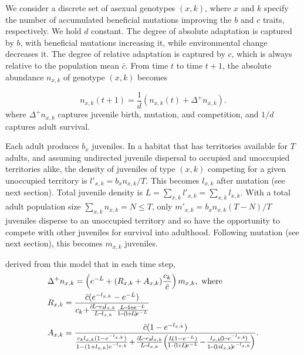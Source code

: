 \documentclass[9pt,twocolumn,twoside,lineno]{gsajnl}
\begin{document}
We consider a discrete set of asexual genotypes $(x,k)$, where $x$ and $k$ specify the number of accumulated beneficial mutations improving the $b$ and $c$ traits, respectively. We hold $d$ constant. The degree of absolute adaptation is captured by $b$, with beneficial mutations increasing it, while environmental change decreases it. The degree of relative adaptation is captured by $c$, which is always relative to the population mean $\bar{c}$. From time $t$ to time $t+1$, the absolute abundance $n_{x,k}$ of genotype $(x,k)$ becomes \citep{bertram2019density}

\begin{equation}
    \label{eq:CompleteTimeStep}
    n_{x,k} (t+1) = \frac{1}{d}\left(n_{x,k} (t)+\Delta^+{n_{x,k}}\right).
\end{equation}
where $\Delta^+ n_{x,k}$ captures juvenile birth, mutation, and competition, and $1/d$ captures adult survival. 

Each adult produces $b_{x}$ juveniles. In a habitat that has territories available for $T$ adults, and assuming undirected juvenile dispersal to occupied and unoccupied territories alike, the density of juveniles of type $(x,k)$ competing for a given unoccupied territory is $l'_{x,k} = b_{x} n_{x,k}/T$. This becomes $l_{x,k}$ after mutation (see next section). Total juvenile density is $L=\sum_{x,k} l'_{x,k}=\sum_{x,k} l_{x,k}$. With a total adult population size $\sum_{x,k} n_{x,k}=N \leq T$, only ${m'}_{x,k} = b_{x} n_{x,k} (T-N)/T$ juveniles disperse to an unoccupied territory and so have the opportunity to compete with other juveniles for survival into adulthood. Following mutation (see next section), this becomes $m_{x,k}$ juveniles. 

\citet{bertram2019density} derived from this model that in each time step,
\begin{equation}\label{eq:BMlotNewAd}
\begin{aligned}
&\Delta^+ n_{x,k} = \left(e^{-L} +(R_{x,k}+A_{x,k})\frac{c_{k}}{\bar{c}} \right)m_{x,k} \rm{,\ where}\\
&R_{x,k} = \frac{\bar{c}(e^{-l_{x,k}}-e^{-L})}{c_{k}\! +\!\frac{\!\bar{c}\!L\!-\!c_{k}\!l_{x,k}}{L\!-\!l_{x,k}}\frac{L\!-\!1\!+\!e^{-L}}{1\!-\!(\!1\!+\!L\!)\!e^{-L}}}\\[3pt]
&A_{x,k} = \frac{\bar{c}(1-e^{-l_{x,k}})}{ \footnotesize \frac{c_{k} l_{x,k}(1-e^{-l_{x,k}})}{1-(1+l_{x,k})e^{-l_{x,k}}}\!+\!\frac{\bar{c}\!L\!-\!c_{k}\!l_{x,k}}{L\!-\!l_{x,k}}\!\left(\!\frac{L\!(1-e^{-L})}{1\!-\!(\!1\!+\!L\!)\!e^{-L}}\!-\!\frac{l_{x,k}\!(\!1\!-\!e^{-l_{x,k}}\!)}{1\!-\!(\!1\!+\!l_{x,k}\!)\!e^{-l_{x,k}}}\!\right)}.\\
\end{aligned}
\end{equation}
\end{document}
